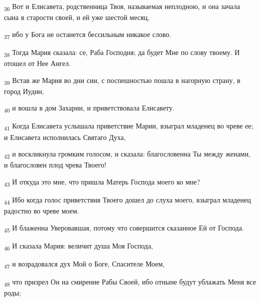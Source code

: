 \begin{tcolorbox}
\textsubscript{36} Вот и Елисавета, родственница Твоя, называемая неплодною, и она зачала сына в старости своей, и ей уже шестой месяц,
\end{tcolorbox}
\begin{tcolorbox}
\textsubscript{37} ибо у Бога не останется бессильным никакое слово.
\end{tcolorbox}
\begin{tcolorbox}
\textsubscript{38} Тогда Мария сказала: се, Раба Господня; да будет Мне по слову твоему. И отошел от Нее Ангел.
\end{tcolorbox}
\begin{tcolorbox}
\textsubscript{39} Встав же Мария во дни сии, с поспешностью пошла в нагорную страну, в город Иудин,
\end{tcolorbox}
\begin{tcolorbox}
\textsubscript{40} и вошла в дом Захарии, и приветствовала Елисавету.
\end{tcolorbox}
\begin{tcolorbox}
\textsubscript{41} Когда Елисавета услышала приветствие Марии, взыграл младенец во чреве ее; и Елисавета исполнилась Святаго Духа,
\end{tcolorbox}
\begin{tcolorbox}
\textsubscript{42} и воскликнула громким голосом, и сказала: благословенна Ты между женами, и благословен плод чрева Твоего!
\end{tcolorbox}
\begin{tcolorbox}
\textsubscript{43} И откуда это мне, что пришла Матерь Господа моего ко мне?
\end{tcolorbox}
\begin{tcolorbox}
\textsubscript{44} Ибо когда голос приветствия Твоего дошел до слуха моего, взыграл младенец радостно во чреве моем.
\end{tcolorbox}
\begin{tcolorbox}
\textsubscript{45} И блаженна Уверовавшая, потому что совершится сказанное Ей от Господа.
\end{tcolorbox}
\begin{tcolorbox}
\textsubscript{46} И сказала Мария: величит душа Моя Господа,
\end{tcolorbox}
\begin{tcolorbox}
\textsubscript{47} и возрадовался дух Мой о Боге, Спасителе Моем,
\end{tcolorbox}
\begin{tcolorbox}
\textsubscript{48} что призрел Он на смирение Рабы Своей, ибо отныне будут ублажать Меня все роды;
\end{tcolorbox}
